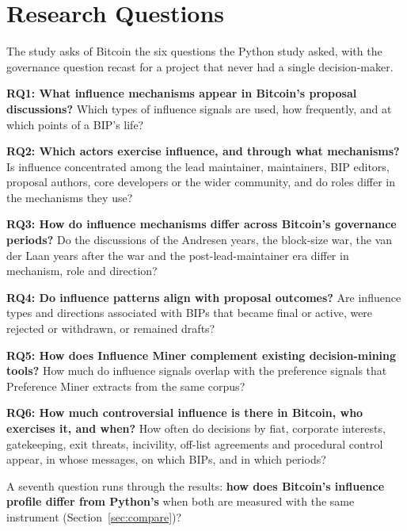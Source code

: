 \section{Research Questions}

The study asks of Bitcoin the six questions the Python study asked, with the governance question recast for a project that never had a single decision-maker.

\textbf{RQ1: What influence mechanisms appear in Bitcoin's proposal discussions?} Which types of influence signals are used, how frequently, and at which points of a BIP's life?

\textbf{RQ2: Which actors exercise influence, and through what mechanisms?} Is influence concentrated among the lead maintainer, maintainers, BIP editors, proposal authors, core developers or the wider community, and do roles differ in the mechanisms they use?

\textbf{RQ3: How do influence mechanisms differ across Bitcoin's governance periods?} Do the discussions of the Andresen years, the block-size war, the van der Laan years after the war and the post-lead-maintainer era differ in mechanism, role and direction?

\textbf{RQ4: Do influence patterns align with proposal outcomes?} Are influence types and directions associated with BIPs that became final or active, were rejected or withdrawn, or remained drafts?

\textbf{RQ5: How does Influence Miner complement existing decision-mining tools?} How much do influence signals overlap with the preference signals that Preference Miner extracts from the same corpus?

\textbf{RQ6: How much controversial influence is there in Bitcoin, who exercises it, and when?} How often do decisions by fiat, corporate interests, gatekeeping, exit threats, incivility, off-list agreements and procedural control appear, in whose messages, on which BIPs, and in which periods?

A seventh question runs through the results: \textbf{how does Bitcoin's influence profile differ from Python's} when both are measured with the same instrument (Section~\ref{sec:compare})?

